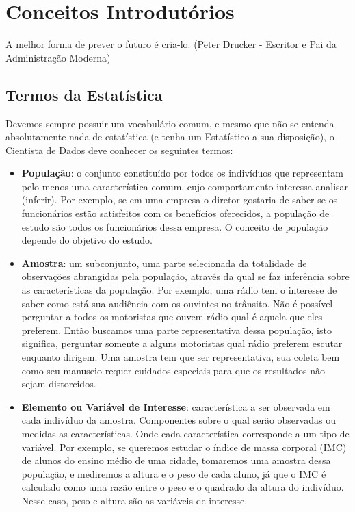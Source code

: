 \chapter{Conceitos Introdutórios}

\begin{remark}
A melhor forma de prever o futuro é cria-lo. (Peter Drucker - Escritor e Pai da Administração Moderna) 
\end{remark}

\section{Termos da Estatística}
Devemos sempre possuir um vocabulário comum, e mesmo que não se entenda absolutamente nada de estatística (e tenha um Estatístico a sua disposição), o Cientista de Dados deve conhecer os seguintes termos:
\begin{itemize}
	\item \textbf{População}: o conjunto constituído por todos os indivíduos que representam pelo menos uma característica comum, cujo comportamento interessa analisar (inferir). Por exemplo, se em uma empresa o diretor gostaria de saber se os funcionários estão satisfeitos com os benefícios oferecidos, a população de estudo são todos os funcionários dessa empresa. O conceito de população depende do objetivo do estudo.
	\item \textbf{Amostra}: um subconjunto, uma parte selecionada da totalidade de observações abrangidas pela população, através da qual se faz inferência sobre as características da população. Por exemplo, uma rádio tem o interesse de saber como está sua audiência com os ouvintes no trânsito. Não é possível perguntar a todos os motoristas que ouvem rádio qual é aquela que eles preferem. Então buscamos uma parte representativa dessa população, isto significa, perguntar somente a alguns motoristas qual rádio preferem escutar enquanto dirigem. Uma amostra tem que ser representativa, sua coleta bem como seu manuseio requer cuidados especiais para que os resultados não sejam distorcidos. 
	\item \textbf{Elemento ou Variável de Interesse}: característica a ser observada em cada indivíduo da amostra. Componentes sobre o qual serão observadas ou medidas as características. Onde cada característica corresponde a um tipo de variável. Por exemplo, se queremos estudar o índice de massa corporal (IMC) de alunos do ensino médio de uma cidade, tomaremos uma amostra dessa população, e mediremos a altura e o peso de cada aluno, já que o IMC é calculado como uma razão entre o peso e o quadrado da altura do indivíduo. Nesse caso, peso e altura são as variáveis de interesse.
\end{itemize}


